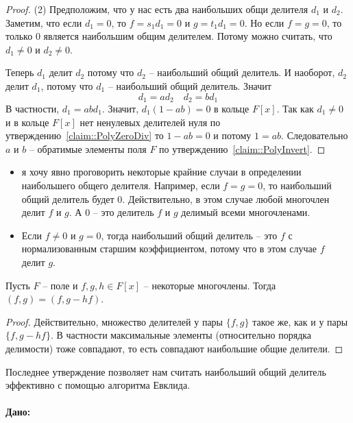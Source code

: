 \begin{proof}
(2) Предположим, что у нас есть два наибольших общи делителя $d_1$ и $d_2$.
Заметим, что если $d_1 = 0$, то $f = s_1 d_1 = 0$ и $g = t_1 d_1 = 0$.
Но если $f = g = 0$, то только $0$ является наибольшим общим делителем.
Потому можно считать, что $d_1\neq 0$ и $d_2\neq 0$.

Теперь $d_1$ делит $d_2$ потому что $d_2$ -- наибольший общий делитель.
И наоборот, $d_2$ делит $d_1$, потому что $d_1$ -- наибольший общий делитель.
Значит
\[
d_1 = a d_2\quad d_2 = b d_1
\]
В частности, $d_1 = ab d_1$.
Значит, $d_1(1 - ab)= 0$ в кольце $F[x]$.
Так как $d_1 \neq 0$ и в кольце $F[x]$ нет ненулевых делителей нуля по утверждению~\ref{claim::PolyZeroDiv} то $1 - ab = 0$ и потому $1 = ab$.
Следовательно $a$ и $b$ -- обратимые элементы поля $F$ по утверждению~\ref{claim::PolyInvert}.
\end{proof}

\begin{remarks}
\begin{itemize}
\item я хочу явно проговорить некоторые крайние случаи в определении наибольшего общего делителя.
Например, если $f = g = 0$, то наибольший общий делитель будет $0$.
Действительно, в этом случае любой многочлен делит $f$ и $g$.
А $0$ -- это делитель $f$ и $g$ делимый всеми многочленами.

\item Если $f \neq 0$ и $g = 0$, тогда наибольший общий делитель -- это $f$ с нормализованным старшим коэффициентом, потому что в этом случае $f$ делит $g$.
\end{itemize}
\end{remarks}


\begin{claim}
Пусть $F$ -- поле и $f, g, h\in F[x]$ -- некоторые многочлены.
Тогда $(f, g) = (f, g - hf)$.
\end{claim}
\begin{proof}
Действительно, множество делителей у пары $\{f, g\}$ такое же, как и у пары $\{f, g-hf\}$.
В частности максимальные элементы (относительно порядка делимости) тоже совпадают, то есть совпадают наибольшие общие делители.
\end{proof}

Последнее утверждение позволяет нам считать наибольший общий делитель эффективно с помощью алгоритма Евклида.

\paragraph{Дано:}

